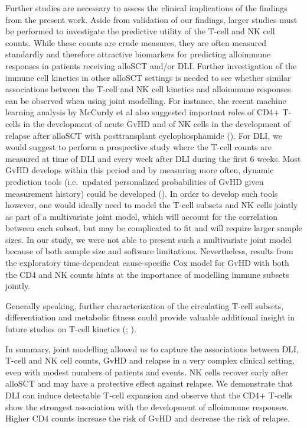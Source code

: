 \documentclass[
  letterpaper,
  DIV=11,
  numbers=noendperiod]{scrreprt}
\begin{document}
Further studies are necessary to assess the clinical implications of the
findings from the present work. Aside from validation of our findings,
larger studies must be performed to investigate the predictive utility
of the T-cell and NK cell counts. While these counts are crude measures,
they are often measured standardly and therefore attractive biomarkers
for predicting alloimmune responses in patients receiving alloSCT and/or
DLI. Further investigation of the immune cell kinetics in other alloSCT
settings is needed to see whether similar associations between the
T-cell and NK cell kinetics and alloimmune responses can be observed
when using joint modelling. For instance, the recent machine learning
analysis by McCurdy et al also suggested important roles of CD4+ T-cells
in the development of acute GvHD and of NK cells in the development of
relapse after alloSCT with posttransplant cyclophosphamide
(). For DLI, we would suggest to perform a prospective study where
the T-cell counts are measured at time of DLI and every week after DLI
during the first 6 weeks. Most GvHD develops within this period and by
measuring more often, dynamic prediction tools (i.e.~updated
personalized probabilities of GvHD given measurement history) could be
developed
(). In order to develop such tools however, one would
ideally need to model the T-cell subsets and NK cells jointly as part of
a multivariate joint model, which will account for the correlation
between each subset, but may be complicated to fit and will require
larger sample sizes. In our study, we were not able to present such a
multivariate joint model because of both sample size and software
limitations. Nevertheless, results from the exploratory time-dependent
cause-specific Cox model for GvHD with both the CD4 and NK counts hints
at the importance of modelling immune subsets jointly.

Generally speaking, further characterization of the circulating T-cell
subsets, differentiation and metabolic fitness could provide valuable
additional insight in future studies on T-cell kinetics
(; ).

In summary, joint modelling allowed us to capture the associations
between DLI, T-cell and NK cell counts, GvHD and relapse in a very
complex clinical setting, even with modest numbers of patients and
events. NK cells recover early after alloSCT and may have a protective
effect against relapse. We demonstrate that DLI can induce detectable
T-cell expansion and observe that the CD4+ T-cells show the strongest
association with the development of alloimmune responses. Higher CD4
counts increase the risk of GvHD and decrease the risk of relapse.
\end{document}
